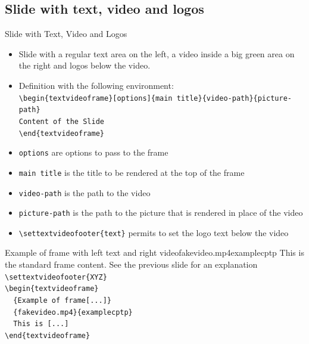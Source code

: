 \documentclass[english,sectioncirclenumberstyle]{ciadbeamer}
\begin{document}
\subsection{Slide with text, video and logos}
\subsectiontableofcontentslide

\begin{frame}{Slide with Text, Video and Logos}
	\begin{itemize}
		\item Slide with a regular text area on the left, a video inside a big green area on the right and logos below the video.
		\item Definition with the following environment: \\
		\texttt{{\textbackslash}begin\{textvideoframe\}[options]\{main title\}\{video-path\}\{picture-path\}} \\
		\texttt{Content of the Slide} \\
		\texttt{{\textbackslash}end\{textvideoframe\}}
		\item \texttt{options} are options to pass to the frame
		\item \texttt{main title} is the title to be rendered at the top of the frame
		\item \texttt{video-path} is the path to the video
		\item \texttt{picture-path} is the path to the picture that is rendered in place of the video
		\item \texttt{{\textbackslash}settextvideofooter\{text\}} permits to set the logo text below the video
	\end{itemize}
\end{frame}

\begin{textvideoframe}{{Example of frame} with left text and right video}{fakevideo.mp4}{examplecptp}
	This is the standard frame content. See the previous slide for an explanation \\[.5cm]
	\texttt{{\textbackslash}settextvideofooter\{XYZ\}} \\[.5cm]
	\texttt{{\textbackslash}begin\{textvideoframe\}} \\
	\texttt{~~\{Example of frame[...]\}} \\
	\texttt{~~\{fakevideo.mp4\}\{examplecptp\}} \\
	\texttt{~~This is [...]} \\
	\texttt{{\textbackslash}end\{textvideoframe\}}
\end{textvideoframe}
\end{document}
